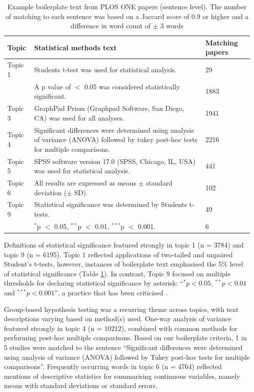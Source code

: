 \documentclass[12pt]{article}
\begin{document}
\begin{landscape}
\begin{table}

\caption{\label{tab:plos-example-boilerplate}Example boilerplate text from PLOS ONE papers (sentence level). The number of matching to each sentence was based on a Jaccard score of 0.9 or higher and a difference in word count of $\pm$ 3 words}
\centering
\begin{tabular}[t]{p{}p{}p{}}
\hline
Topic & Statistical methods text & Matching papers\\
\hline
Topic 1 & Students t-test was used for statistical analysis. & 29\\
\cline{2-3}
 & A p value of $<$ 0.05 was considered statistically significant. & 1883\\
\hline
Topic 3 & GraphPad Prism (Graphpad Software, San Diego, CA) was used for all analyses. & 1941\\
\hline
Topic 4 & Significant differences were determined using analysis of variance (ANOVA) followed by tukey post-hoc tests for multiple comparisons. & 2216\\
\hline
Topic 5 & SPSS software version 17.0 (SPSS, Chicago, IL, USA) was used for statistical analysis. & 441\\
\hline
Topic 6 & All results are expressed as means $\pm$ standard deviation ($\pm$ SD). & 102\\
\hline
Topic 9 & Statistical significance was determined by Students t-tests. & 49\\
\cline{2-3}
&  $^*$p $<$ 0.05, $^{**}$p $<$ 0.01, $^{***}$p $<$ 0.001. & 6\\
\hline
\end{tabular}
\end{table}
\end{landscape}


Definitions of statistical significance featured strongly in topic 1 (n
= 3784) and topic 9 (n = 6195). Topic 1 reflected
applications of two-tailed and unpaired Student's t-tests, however,
instances of boilerplate text emphasised the 5\% level of statistical
significance (Table \ref{tab:plos-example-boilerplate}). In contrast, Topic 9
focused on multiple thresholds for declaring statistical significance by
asterisk: ``\(^{*}p<0.05\), \(^{**}p<0.01\) and \(^{***}p<0.001\)'', a
practice that has been criticised \citep{Wasserstein2019}.

Group-based hypothesis testing was a recurring theme across topics, with
text descriptions varying based on method(s) used. One-way analysis of
variance featured strongly in topic 4 (n = 10212), combined
with common methods for performing post-hoc multiple comparisons. Based
on our boilerplate criteria, 1 in 5 studies were matched to the sentence
``Significant differences were determined using analysis of variance
(ANOVA) followed by Tukey post-hoc tests for multiple comparisons''.
Frequently occurring words in topic 6 (n = 4764) reflected
mentions of descriptive statistics for summarising continuous variables,
namely means with standard deviations or standard errors.
\end{document}
